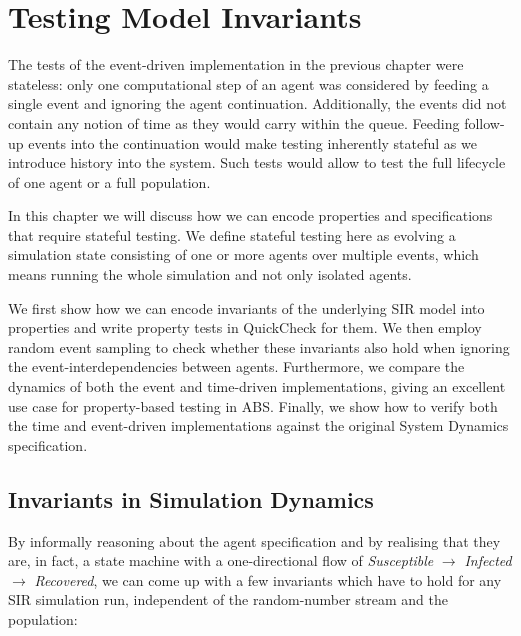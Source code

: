 \chapter{Testing Model Invariants}
\label{ch:sir_invariants}
The tests of the event-driven implementation in the previous chapter were stateless: only one computational step of an agent was considered by feeding a single event and ignoring the agent continuation. Additionally, the events did not contain any notion of time as they would carry within the queue. Feeding follow-up events into the continuation would make testing inherently stateful as we introduce history into the system. Such tests would allow to test the full lifecycle of one agent or a full population.

In this chapter we will discuss how we can encode properties and specifications that require stateful testing. We define stateful testing here as evolving a simulation state consisting of one or more agents over multiple events, which means running the whole simulation and not only isolated agents.

We first show how we can encode invariants of the underlying SIR model into properties and write property tests in QuickCheck for them. We then employ random event sampling to check whether these invariants also hold when ignoring the event-interdependencies between agents. Furthermore, we compare the dynamics of both the event and time-driven implementations, giving an excellent use case for property-based testing in ABS. Finally, we show how to verify both the time and event-driven implementations against the original System Dynamics specification.

\section{Invariants in Simulation Dynamics}
\label{sec:prop_invariants_dynamics}
By informally reasoning about the agent specification and by realising that they are, in fact, a state machine with a one-directional flow of \textit{Susceptible} $\rightarrow$ \textit{Infected} $\rightarrow$ \textit{Recovered}, we can come up with a few invariants which have to hold for any SIR simulation run, independent of the random-number stream and the population:

